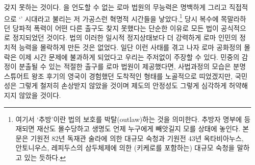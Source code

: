 갖지 못하는 것이다.
을 언도할 수 없는 로마 법원의 무능력은
명백하게 그리고 직접적으로
`' 시대라고 불리는
저 가공스런 혁명적 시간들을 낳았다.\footnote{%
  여기서 `추방'이란 법의 보호를 박탈(outlaw)하는 것을 의미한다.
  추방자 명부에 등재되면 재산도 몰수당하고 생명도 언제 누구에게 빼앗길지
  모를 상태에 놓인다.
  본문은 기원전 82년 독재관 술라에 의한 대규모 숙청과
  기원전 43년 옥타비아누스, 안토니우스, 레피두스의 삼두체제에 의한
  (키케로를 포함하는) 대규모 숙청을 말하고 있는 듯하다. }
당시
복수에 목말라하던
당파적 폭력이
어떤 다른 출구도 찾지 못했다는 단순한 이유로
모든 법이 공식적으로 정지되었던 것이다.
법의 이러한 일시적 정지상태보다 더 강력하게
로마 인민의 정치적 능력을 몰락하게 만든 것은 없었다.
일단 이런 사태를 겪고 나자
로마 공화정의 몰락은 이제 시간 문제에 불과하게 되었다고
우리는 주저없이 주장할 수 있다.
민중의 감정이 분출될 수 있는 적절한 출구를
로마 법원이
제공했다면,
사법과정의 모습은 분명
스튜어트 왕조 후기의 영국이 경험했던
도착적인 형태를 노골적으로 띠었겠지만,
국민성은 그렇게 철저히 손상받지 않았을 것이며
제도의 안정성도 그렇게 심각하게 허약해지지 않았을 것이다.

